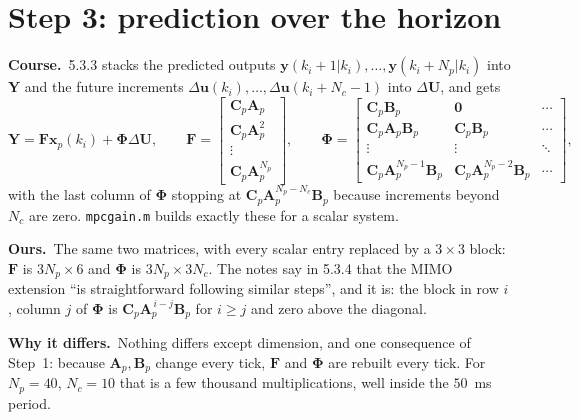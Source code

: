 \documentclass[11pt,a4paper]{article}
\newcommand{\vect}[1]{\bm{#1}}
\newcommand{\mat}[1]{\bm{#1}}
\newcommand{\dU}{\Delta\vect{U}}
\newcommand{\du}{\Delta\vect{u}}
\newcommand{\Np}{N_p}
\newcommand{\Nc}{N_c}
\newcommand{\course}{\textbf{\textcolor{blue!60!black}{Course.}}\ }
\newcommand{\ours}{\textbf{\textcolor{green!45!black}{Ours.}}\ }
\newcommand{\why}{\textbf{\textcolor{red!60!black}{Why it differs.}}\ }
\begin{document}
\section{Step 3: prediction over the horizon}
\course 5.3.3 stacks the predicted outputs $\vect y(k_i+1|k_i),\ldots,\vect y(k_i+\Np|k_i)$ into $\vect Y$ and the future increments $\du(k_i),\ldots,\du(k_i+\Nc-1)$ into $\dU$, and gets
\begin{equation}
\vect Y = \mat F\vect x_p(k_i) + \mat\Phi\dU,\qquad
\mat F = \begin{bmatrix}\mat C_p\mat A_p\\ \mat C_p\mat A_p^2\\ \vdots\\ \mat C_p\mat A_p^{\Np}\end{bmatrix},\qquad
\mat\Phi = \begin{bmatrix}\mat C_p\mat B_p & \mat 0 & \cdots\\ \mat C_p\mat A_p\mat B_p & \mat C_p\mat B_p & \cdots\\ \vdots & \vdots & \ddots\\ \mat C_p\mat A_p^{\Np-1}\mat B_p & \mat C_p\mat A_p^{\Np-2}\mat B_p & \cdots\end{bmatrix},
\end{equation}
with the last column of $\mat\Phi$ stopping at $\mat C_p\mat A_p^{\Np-\Nc}\mat B_p$ because increments beyond $\Nc$ are zero. \texttt{mpcgain.m} builds exactly these for a scalar system.

\ours The same two matrices, with every scalar entry replaced by a $3\times3$ block: $\mat F$ is $3\Np\times 6$ and $\mat\Phi$ is $3\Np\times 3\Nc$. The notes say in 5.3.4 that the MIMO extension ``is straightforward following similar steps'', and it is: the block in row $i$, column $j$ of $\mat\Phi$ is $\mat C_p\mat A_p^{\,i-j}\mat B_p$ for $i\ge j$ and zero above the diagonal.

\why Nothing differs except dimension, and one consequence of Step~1: because $\mat A_p, \mat B_p$ change every tick, $\mat F$ and $\mat\Phi$ are rebuilt every tick. For $\Np = 40$, $\Nc = 10$ that is a few thousand multiplications, well inside the $50$~ms period.
\end{document}
